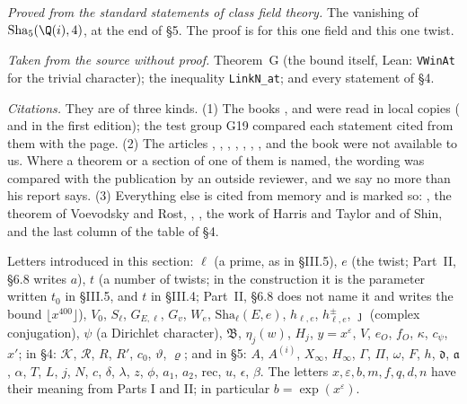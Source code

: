 \documentclass[11pt,letterpaper]{article}
\begin{document}
\emph{Proved from the standard statements of class field theory.} The vanishing of
$\mathrm{Sha}_5(\Q(i),4)$, at the end of \S5. The proof is for this one field and this one twist.

\emph{Taken from the source without proof.} Theorem~G (the bound itself, Lean: \texttt{VWinAt} for the
trivial character); the inequality \texttt{LinkN\_at}; and every statement of \S4.

\emph{Citations.} They are of three kinds. (1) The books \cite{Was82}, \cite{Neu99} and \cite{NSW00} were
read in local copies (\cite{Was82} and \cite{NSW00} in the first edition); the test group G19 compared each
statement cited from them with the page. (2) The articles \cite{Sou03}, \cite{Kat04}, \cite{Kur92},
\cite{BC04}, \cite{Car12}, \cite{Car14}, \cite{CH13}, \cite{BS23} and the book \cite{Rub00} were not available to us.
Where a theorem or a section of one of them is named, the wording was compared with the publication by an
outside reviewer, and we say no more than his report says. (3) Everything else is cited from memory and is
marked so: \cite{Sou79}, the theorem of Voevodsky and Rost, \cite{MW84}, \cite{FW79}, the work of Harris and
Taylor and of Shin, and the last column of the table of \S4.

Letters introduced in this section: $\ell$ (a prime, as in \S III.5), $e$ (the twist; Part~II, \S6.8 writes
$a$), $t$ (a number of twists; in the construction it is the parameter written $t_0$ in \S III.5, and $t$
in \S III.4; Part~II, \S6.8 does not name it and writes the bound $\lfloor x^{400}\rfloor$), $V_0$, $S_\ell$, $G_{E,\ell}$, $G_v$, $W_e$, $\mathrm{Sha}_\ell(E,e)$,
$h_{\ell,e}$, $h^{\pm}_{\ell,e}$, $\jmath$ (complex conjugation), $\psi$ (a Dirichlet character),
$\mathfrak B$, $\eta_j(w)$, $H_j$, $y=x^{\varepsilon}$, $V$, $e_O$, $f_O$, $\kappa$, $c_\psi$, $x'$; in \S4:
$\mathcal K$, $\mathcal R$, $R$, $R'$, $c_0$, $\vartheta$, $\varrho$; and in \S5: $A$, $A^{(i)}$,
$X_\infty$, $H_\infty$, $\Gamma$, $\Pi$, $\omega$, $F$, $h$, $\mathfrak d$, $\mathfrak a$, $\alpha$, $T$, $L$,
$j$, $N$, $c$, $\delta$, $\lambda$, $z$, $\phi$, $a_1$, $a_2$, $\mathrm{rec}$, $u$, $\epsilon$, $\beta$. The
letters $x,\varepsilon,b,m,f,q,d,n$ have their meaning from Parts I and II; in particular
$b=\exp(x^{\varepsilon})$.
\end{document}
